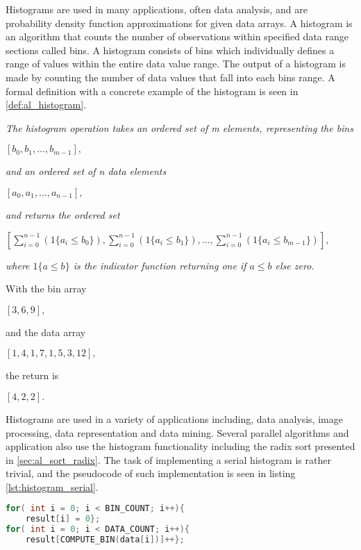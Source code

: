Histograms are used in many applications, often data analysis, and are probability density function approximations for given data arrays. A histogram is an algorithm that counts the number of observations within specified data range sections called bins. A histogram consists of bins which individually defines a range of values within the entire data value range. The output of a histogram is made by counting the number of data values that fall into each bins range. A formal definition with a concrete example of the histogram is seen in \cref{def:al_histogram}.

\begin{definition}
	\label{def:al_histogram}
	\textit{The histogram operation takes an ordered set of m elements, representing the bins}
	\begin{center}
		$[b_0,b_1,...,b_{m-1}],$
	\end{center}
	\textit{and an ordered set of n data elements}
	\begin{center}
		$[a_0,a_1,...,a_{n-1}],$
	\end{center}
	\textit{and returns the ordered set}
	\begin{center}
		$[\sum_{i=0}^{n-1}(1\{ a_i \leq b_0 \}),\sum_{i=0}^{n-1}(1\{a_i \leq b_1\}),...,\sum_{i=0}^{n-1}(1\{a_i \leq b_{m-1}\})],$
	\end{center}
	\textit{where $1\{a\leq b\}$ is the indicator function returning one if $a\leq b$ else zero.}
\end{definition}
\begin{example}
	With the bin array
		\begin{center}
		$[3,6,9],$
	\end{center}
	and the data array 
		\begin{center}
		$[1,4,1,7,1,5,3,12],$
	\end{center}
	the return is
		\begin{center}
		$[4,2,2].$
	\end{center}
\end{example}

Histograms are used in a variety of applications including, data analysis, image processing, data representation and data mining. Several parallel algorithms and application also use the histogram functionality including the radix sort presented in \cref{sec:al_sort_radix}. The task of implementing a serial histogram is rather trivial, and the pseudocode of such implementation is seen in listing \ref{lst:histogram_serial}.

\begin{lstlisting}[language=C,caption={TBD},label=lst:histogram_serial]
for( int i = 0; i < BIN_COUNT; i++){
	result[i] = 0}; 
for( int i = 0; i < DATA_COUNT; i++){ 
	result[COMPUTE_BIN(data[i])]++}; 
\end{lstlisting}

